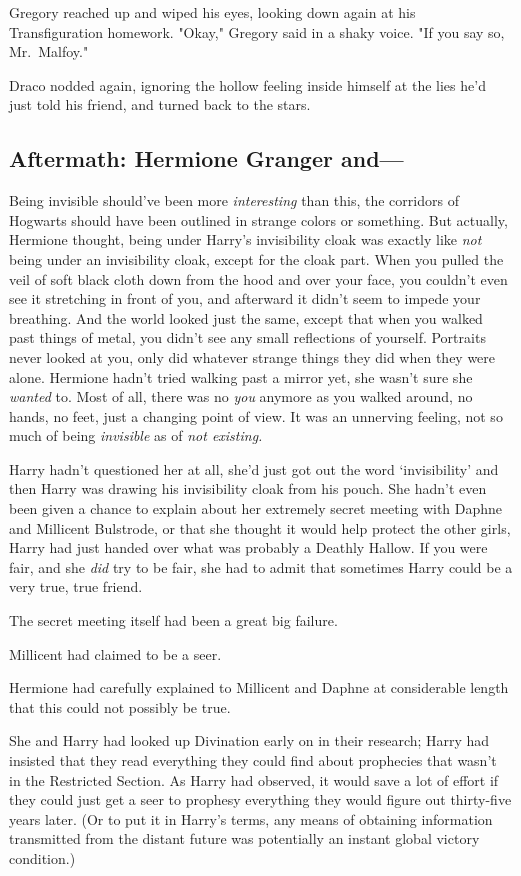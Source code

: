 Gregory reached up and wiped his eyes, looking down again at his 
Transfiguration homework. "Okay," Gregory said in a shaky voice. "If you say 
so, Mr.~Malfoy."

Draco nodded again, ignoring the hollow feeling inside himself at the lies he'd 
just told his friend, and turned back to the stars.
\sbreak
\subsection{Aftermath: Hermione Granger and---}

Being invisible should've been more \emph{interesting} than this, the corridors 
of Hogwarts should have been outlined in strange colors or something. But 
actually, Hermione thought, being under Harry's invisibility cloak was exactly 
like \emph{not} being under an invisibility cloak, except for the cloak part. 
When you pulled the veil of soft black cloth down from the hood and over your 
face, you couldn't even see it stretching in front of you, and afterward it 
didn't seem to impede your breathing. And the world looked just the same, 
except that when you walked past things of metal, you didn't see any small 
reflections of yourself. Portraits never looked at you, only did whatever 
strange things they did when they were alone. Hermione hadn't tried walking 
past a mirror yet, she wasn't sure she \emph{wanted} to. Most of all, there was 
no \emph{you} anymore as you walked around, no hands, no feet, just a changing 
point of view. It was an unnerving feeling, not so much of being 
\emph{invisible} as of \emph{not existing.}

Harry hadn't questioned her at all, she'd just got out the word `invisibility' 
and then Harry was drawing his invisibility cloak from his pouch. She hadn't 
even been given a chance to explain about her extremely secret meeting with 
Daphne and Millicent Bulstrode, or that she thought it would help protect the 
other girls, Harry had just handed over what was probably a Deathly Hallow. If 
you were fair, and she \emph{did} try to be fair, she had to admit that 
sometimes Harry could be a very true, true friend.

The secret meeting itself had been a great big failure.

Millicent had claimed to be a seer.

Hermione had carefully explained to Millicent and Daphne at considerable length 
that this could not possibly be true.

She and Harry had looked up Divination early on in their research; Harry had 
insisted that they read everything they could find about prophecies that wasn't 
in the Restricted Section. As Harry had observed, it would save a lot of effort 
if they could just get a seer to prophesy everything they would figure out 
thirty-five years later. (Or to put it in Harry's terms, any means of obtaining 
information transmitted from the distant future was potentially an instant 
global victory condition.)

